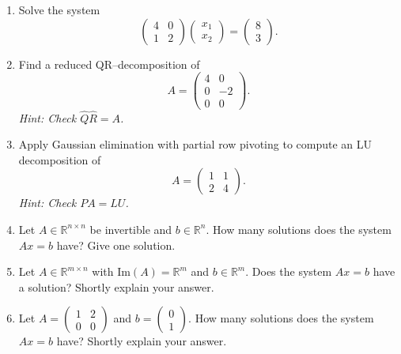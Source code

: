 \vspace*{-0.5cm}
\begin{enumerate}
	
	\item Solve the system
	$$\begin{pmatrix}
	4 & 0\\
	1 & 2
	\end{pmatrix}\begin{pmatrix}
	x_1 \\ x_2
	\end{pmatrix} = \begin{pmatrix}
	8 \\ 3
	\end{pmatrix}.  $$
	\item Find a reduced QR--decomposition of 
		$$A = \begin{pmatrix}
	4 & 0\\
	0 & -2 \\
	0 & 0
	\end{pmatrix} .$$
	\textit{Hint: Check $\widehat{Q}\widehat{R} = A$.}
	\item Apply Gaussian elimination with partial row pivoting to compute an LU decomposition of 
	$$A = \begin{pmatrix}
	1 & 1\\
	2 & 4
	\end{pmatrix} .$$
	\textit{Hint: Check $PA=LU$.}
	\item Let $A \in \mathbb{R}^{n \times n}$ be invertible and $b \in \mathbb{R}^n$. How many solutions does the system $Ax=b$ have? Give one solution.
	\item Let $A \in \mathbb{R}^{m \times n}$ with $\text{Im}(A)=\mathbb{R}^m$ and $b \in \mathbb{R}^m$. Does the system $Ax=b$ have a solution? Shortly explain your answer.
	\item Let $A = \begin{pmatrix}
	1 & 2\\
	0 & 0
	\end{pmatrix}$ and $b = \begin{pmatrix}
	0\\1
	\end{pmatrix}$. How many solutions does the system $Ax=b$ have? Shortly explain your answer.
\end{enumerate}
 